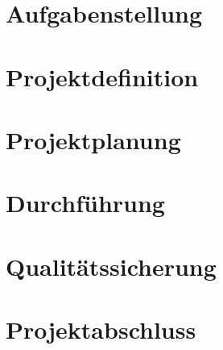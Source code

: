 


%
%

\begin{singlespace}
	\tableofcontents{}	\pagebreak
\end{singlespace}

\pagestyle{scrheadings} 	%
\setcounter{page}{1}
\section{Aufgabenstellung}

\pagebreak
\section{Projektdefinition}

\section{Projektplanung}

\section{Durchführung}

\pagebreak
\section{Qualitätssicherung}

\section{Projektabschluss}



\pagebreak
\printbibliography
\pagebreak




